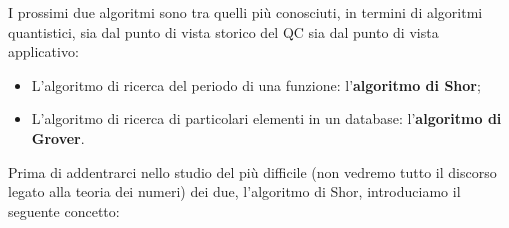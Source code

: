 
\vspace{1cm}

\noindent{}
\vspace{0.5cm}
\noindent I prossimi due algoritmi sono tra quelli più conosciuti, in termini di algoritmi quantistici, sia dal punto di vista storico del QC sia dal punto di vista applicativo:
\begin{itemize}
    \item L'algoritmo di ricerca del periodo di una funzione: l'\textbf{algoritmo di Shor};
    \item L'algoritmo di ricerca di particolari elementi in un database: l'\textbf{algoritmo di Grover}.
\end{itemize}
Prima di addentrarci nello studio del più difficile (non vedremo tutto il discorso legato alla teoria dei numeri) dei due, l'algoritmo di Shor, introduciamo il seguente concetto:


